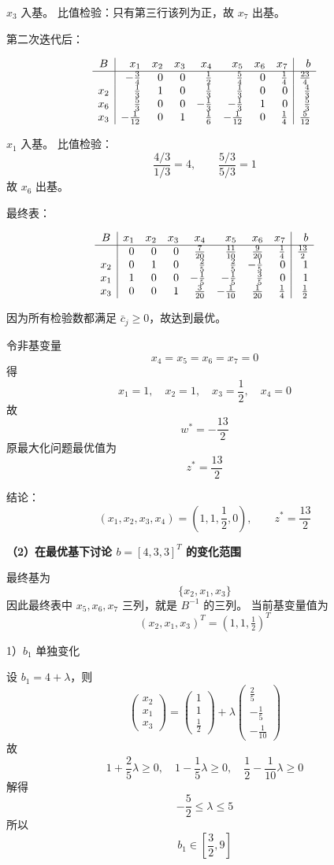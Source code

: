 \documentclass[12pt,a4paper]{article}
\begin{document}
$x_3$ 入基。
比值检验：只有第三行该列为正，故 $x_7$ 出基。

第二次迭代后：

\[
\begin{array}{c|rrrrrrr|r}
B & x_1&x_2&x_3&x_4&x_5&x_6&x_7&b\\
\hline
  & -\frac34&0&0&\frac12&\frac54&0&\frac14&\frac{23}{4}\\
x_2&\frac13&1&0&\frac13&\frac13&0&0&\frac43\\
x_6&\frac53&0&0&-\frac13&-\frac13&1&0&\frac53\\
x_3&-\frac1{12}&0&1&\frac16&-\frac1{12}&0&\frac14&\frac5{12}
\end{array}
\]

 $x_1$ 入基。
比值检验：
\[
\frac{4/3}{1/3}=4,\qquad \frac{5/3}{5/3}=1
\]
故 $x_6$ 出基。

最终表：

\[
\begin{array}{c|rrrrrrr|r}
B & x_1&x_2&x_3&x_4&x_5&x_6&x_7&b\\
\hline
  & 0&0&0&\frac7{20}&\frac{11}{10}&\frac9{20}&\frac14&\frac{13}{2}\\
x_2&0&1&0&\frac25&\frac25&-\frac15&0&1\\
x_1&1&0&0&-\frac15&-\frac15&\frac35&0&1\\
x_3&0&0&1&\frac3{20}&-\frac1{10}&\frac1{20}&\frac14&\frac12
\end{array}
\]

因为所有检验数都满足 $\bar c_j\ge 0$，故达到最优。

令非基变量
\[
x_4=x_5=x_6=x_7=0
\]
得
\[
x_1=1,\quad x_2=1,\quad x_3=\frac12,\quad x_4=0
\]
故
\[
w^*=-\frac{13}{2}
\]
原最大化问题最优值为
\[
z^*=\frac{13}{2}
\]

结论：
\[
(x_1,x_2,x_3,x_4)=\left(1,1,\frac12,0\right),\qquad z^*=\frac{13}{2}
\]

\textbf{（2）在最优基下讨论 $b=[4,3,3]^T$ 的变化范围}

最终基为
\[
\{x_2,x_1,x_3\}
\]
因此最终表中 $x_5,x_6,x_7$ 三列，就是 $B^{-1}$ 的三列。
当前基变量值为
\[
(x_2,x_1,x_3)^T=(1,1,\tfrac12)^T
\]

1）$b_1$ 单独变化

设 $b_1=4+\lambda$，则
\[
\begin{pmatrix}x_2\\x_1\\x_3\end{pmatrix}
=
\begin{pmatrix}1\\1\\\frac12\end{pmatrix}
+\lambda
\begin{pmatrix}\frac25\\-\frac15\\-\frac1{10}\end{pmatrix}
\]
故
\[
1+\frac25\lambda\ge 0,\quad 1-\frac15\lambda\ge 0,\quad \frac12-\frac1{10}\lambda\ge 0
\]
解得
\[
-\frac52\le \lambda\le 5
\]
所以
\[
b_1\in \left[\frac32,9\right]
\]
\end{document}
